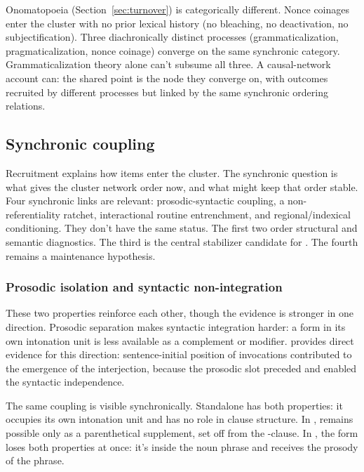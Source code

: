 \documentclass[12pt]{article}
\begin{document}
Onomatopoeia (Section~\ref{sec:turnover}) is categorically different.
Nonce coinages enter the cluster with no prior lexical history (no bleaching, no
deactivation, no subjectification). Three diachronically distinct
processes (grammaticalization, pragmaticalization, nonce coinage)
converge on the same synchronic category. Grammaticalization theory
alone can't subsume all three. A causal-network account can: the shared
point is the node they converge on, with outcomes recruited by different
processes but linked by the same synchronic ordering relations.

\subsection{Synchronic coupling}\label{sec:synchronic-coupling}

Recruitment explains how items enter the cluster. The synchronic
question is what gives the cluster network order now, and what might
keep that order stable. Four synchronic links are relevant:
prosodic-syntactic coupling, a non-referentiality ratchet,
interactional routine entrenchment, and regional/indexical conditioning.
They don't have the same status. The first two order structural
and semantic diagnostics. The third is the central stabilizer candidate
for . The fourth remains a
maintenance hypothesis.

\subsubsection{Prosodic isolation and syntactic non-integration}

These two properties reinforce each other, though the evidence is
stronger in one direction. Prosodic separation makes syntactic
integration harder: a form in its own intonation unit is less available
as a complement or modifier. \textcite[85]{gehweiler2008} provides direct
evidence for this direction: sentence-initial position of invocations
contributed to the emergence of the interjection, because the prosodic slot
preceded and enabled the syntactic independence.

The same coupling is visible synchronically. Standalone
 has both properties: it occupies its own intonation unit
and has no role in clause structure. In ,  remains possible only as a
parenthetical supplement, set off from the -clause. In
, the form loses both properties at once: it's
inside the noun phrase and receives the prosody of the phrase.
\end{document}
